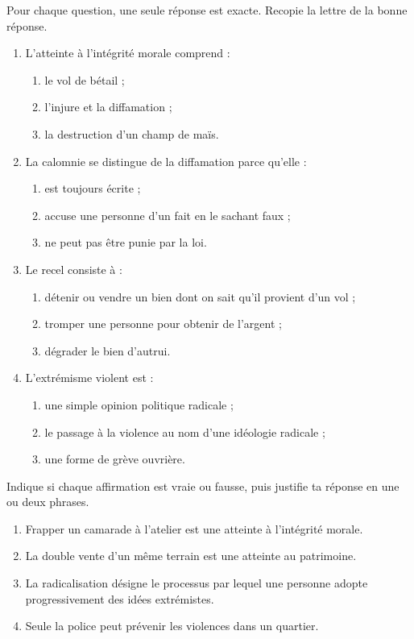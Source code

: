\documentclass[11pt]{article}
\begin{document}
\begin{exercice}
Pour chaque question, une seule réponse est exacte. Recopie la lettre de la bonne réponse.
\begin{enumerate}
\item L'atteinte à l'intégrité morale comprend :
\begin{enumerate}
\item le vol de bétail ;
\item l'injure et la diffamation ;
\item la destruction d'un champ de maïs.
\end{enumerate}
\item La calomnie se distingue de la diffamation parce qu'elle :
\begin{enumerate}
\item est toujours écrite ;
\item accuse une personne d'un fait en le sachant faux ;
\item ne peut pas être punie par la loi.
\end{enumerate}
\item Le recel consiste à :
\begin{enumerate}
\item détenir ou vendre un bien dont on sait qu'il provient d'un vol ;
\item tromper une personne pour obtenir de l'argent ;
\item dégrader le bien d'autrui.
\end{enumerate}
\item L'extrémisme violent est :
\begin{enumerate}
\item une simple opinion politique radicale ;
\item le passage à la violence au nom d'une idéologie radicale ;
\item une forme de grève ouvrière.
\end{enumerate}
\end{enumerate}
\end{exercice}

\begin{exercice}
Indique si chaque affirmation est vraie ou fausse, puis justifie ta réponse en une ou deux phrases.
\begin{enumerate}
\item Frapper un camarade à l'atelier est une atteinte à l'intégrité morale.
\item La double vente d'un même terrain est une atteinte au patrimoine.
\item La radicalisation désigne le processus par lequel une personne adopte progressivement des idées extrémistes.
\item Seule la police peut prévenir les violences dans un quartier.
\end{enumerate}
\end{exercice}
\end{document}

